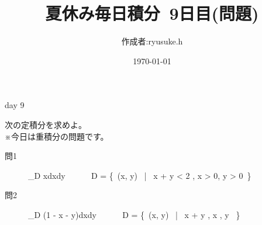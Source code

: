 \documentclass[12pt,a4paper]{jsarticle}
\title{夏休み毎日積分~9日目(問題)}
\date{\today}
\begin{document}
\maketitle
\begin{flushright}
    \author{作成者:ryusuke.h}
\end{flushright}
\begin{itembox}[c]{day 9 }
    \begin{center}
        次の定積分を求めよ。\\
        ※今日は重積分の問題です。
    \end{center}
\end{itembox}

\begin{description}
    \item [問1] {\displaystyle} \iint_D xdxdy ~~~~~ D = \{~(x, y) ~|~ x + y < 2 , x > 0, y > 0~\}
\end{description}

\begin{description}
    \item [問2] {\displaystyle} \iint_D (1 - x - y)dxdy ~~~~~ D = \{~(x, y) ~|~ x + y  , x , y ~\}
\end{description}
\end{document}
